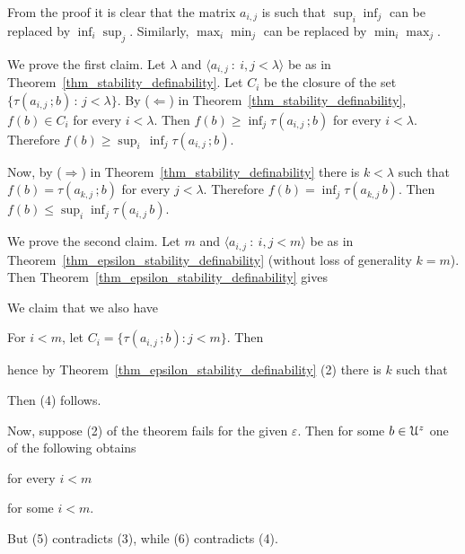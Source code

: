 \documentclass{amsproc}
\makeatletter
\newcounter{thm}
\theoremstyle{mio}
\providecommand{\proofNameStyle}{\bfseries}
\renewenvironment{proof}[1][\proofname]{\par
  \pushQED{\qed}%
  \normalfont%
  \trivlist
  \item[\hskip\labelsep
        \proofNameStyle
    #1\@addpunct{.}]\ignorespaces
}{%
  \popQED\endtrivlist\@endpefalse
}
\makeatother
\begin{document}

From the proof it is clear that the matrix $a_{i,j}$ is such that $\sup_i \inf_j$ can be replaced by $\inf_i \sup_j$.
Similarly, $\max_i \min_j$ can be replaced by $\min_i \max_j$.

\begin{proof}
  We prove the first claim.
  Let $\lambda$ and $\langle a_{i,j}\ :\ i,j<\lambda\rangle$ be as in Theorem~\ref{thm_stability_definability}.
  Let $C_i$ be the closure of the set $\{\tau(a_{i,j}\,;b)\,:\,j<\lambda\}$.
  By ($\Leftarrow$) in Theorem~\ref{thm_stability_definability}, $f(b)\in C_i$ for every $i<\lambda$.
  Then $f(b) \ge \inf_j \tau(a_{i,j}\,;b)$ for every $i<\lambda$.
  Therefore $f(b) \ge \sup_i\,\inf_j \tau(a_{i,j}\,;b)$.
 
  Now, by ($\Rightarrow$) in Theorem~\ref{thm_stability_definability} there is $k<\lambda$ such that $f(b) = \tau(a_{k,j}\,;b)$ for every $j<\lambda$.
  Therefore $f(b) = \inf_j \tau(a_{k,j}\,b)$.
  Then $f(b)\le \sup_i\inf_j \tau(a_{i,j}\,b)$.
  
  We prove the second claim.
  Let $m$ and $\langle a_{i,j}\ :\ i,j<m\rangle$ be as in Theorem~\ref{thm_epsilon_stability_definability} (without loss of generality $k=m$).
  Then Theorem~\ref{thm_epsilon_stability_definability} gives


  We claim that we also have


  For $i<m$, let $C_i=\{\tau(a_{i,j}\,;b):j<m\}$.
  Then 


  hence by Theorem~\ref{thm_epsilon_stability_definability} (2) there is $k$ such that
  

  Then (4) follows.

  Now, suppose (2) of the theorem fails for the given $\varepsilon$.
  Then for some $b\in{\EuScript U}^z$ one of the following obtains

  \hfill for every $i<m$\phantom{.}

  \hfill for some $i<m$.

But (5) contradicts (3), while (6) contradicts (4).
\end{proof}
\end{document}
